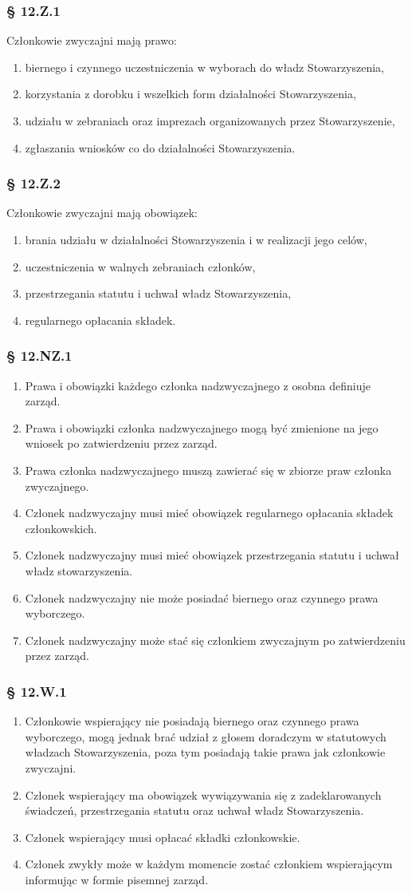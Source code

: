 \documentclass{article}
\newcommand{\myparagraph}[1]{\subsubsection*{#1}}
\begin{document}
\myparagraph{§ 12.Z.1}
Członkowie zwyczajni mają prawo:
\begin{enumerate}
\item
  biernego i czynnego uczestniczenia w wyborach do władz Stowarzyszenia,
\item
  korzystania z dorobku i wszelkich form działalności Stowarzyszenia,
\item
  udziału w zebraniach oraz imprezach organizowanych przez Stowarzyszenie,
\item
  zgłaszania wniosków co do działalności Stowarzyszenia.
\end{enumerate}

\myparagraph{§ 12.Z.2}
Członkowie zwyczajni mają obowiązek:
\begin{enumerate}
\item
  brania udziału w działalności Stowarzyszenia i w realizacji jego celów,
\item
  uczestniczenia w walnych zebraniach członków,
\item
  przestrzegania statutu i uchwał władz Stowarzyszenia,
\item
  regularnego opłacania składek.
\end{enumerate}

\myparagraph{§ 12.NZ.1}
\begin{enumerate}
\item
  Prawa i obowiązki każdego członka nadzwyczajnego z osobna definiuje zarząd.
\item
  Prawa i obowiązki członka nadzwyczajnego mogą być zmienione na jego wniosek po zatwierdzeniu przez zarząd.
\item
  Prawa członka nadzwyczajnego muszą zawierać się w zbiorze praw członka zwyczajnego.
\item
  Członek nadzwyczajny musi mieć obowiązek regularnego opłacania składek członkowskich.
\item
  Członek nadzwyczajny musi mieć obowiązek przestrzegania statutu i uchwał władz stowarzyszenia.
\item 
  Członek nadzwyczajny nie może posiadać biernego oraz czynnego prawa wyborczego.
\item
  Członek nadzwyczajny może stać się członkiem zwyczajnym po zatwierdzeniu przez zarząd.
\end{enumerate}

\myparagraph{§ 12.W.1}
\begin{enumerate}
\item
  Członkowie wspierający nie posiadają biernego oraz czynnego prawa wyborczego, mogą jednak brać udział z głosem doradczym w statutowych władzach Stowarzyszenia, poza tym posiadają takie prawa jak członkowie zwyczajni.
\item
  Członek wspierający ma obowiązek wywiązywania się z zadeklarowanych świadczeń, przestrzegania statutu oraz uchwał władz Stowarzyszenia.
\item
  Członek wspierający musi opłacać składki członkowskie.
\item
  Członek zwykły może w każdym momencie zostać członkiem wspierającym informując w formie pisemnej zarząd.
\end{enumerate}
\end{document}
